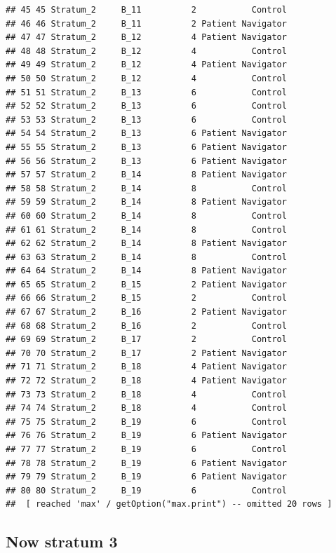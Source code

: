 \documentclass[
]{book}
\begin{document}
\begin{verbatim}
## 45 45 Stratum_2     B_11          2           Control
## 46 46 Stratum_2     B_11          2 Patient Navigator
## 47 47 Stratum_2     B_12          4 Patient Navigator
## 48 48 Stratum_2     B_12          4           Control
## 49 49 Stratum_2     B_12          4 Patient Navigator
## 50 50 Stratum_2     B_12          4           Control
## 51 51 Stratum_2     B_13          6           Control
## 52 52 Stratum_2     B_13          6           Control
## 53 53 Stratum_2     B_13          6           Control
## 54 54 Stratum_2     B_13          6 Patient Navigator
## 55 55 Stratum_2     B_13          6 Patient Navigator
## 56 56 Stratum_2     B_13          6 Patient Navigator
## 57 57 Stratum_2     B_14          8 Patient Navigator
## 58 58 Stratum_2     B_14          8           Control
## 59 59 Stratum_2     B_14          8 Patient Navigator
## 60 60 Stratum_2     B_14          8           Control
## 61 61 Stratum_2     B_14          8           Control
## 62 62 Stratum_2     B_14          8 Patient Navigator
## 63 63 Stratum_2     B_14          8           Control
## 64 64 Stratum_2     B_14          8 Patient Navigator
## 65 65 Stratum_2     B_15          2 Patient Navigator
## 66 66 Stratum_2     B_15          2           Control
## 67 67 Stratum_2     B_16          2 Patient Navigator
## 68 68 Stratum_2     B_16          2           Control
## 69 69 Stratum_2     B_17          2           Control
## 70 70 Stratum_2     B_17          2 Patient Navigator
## 71 71 Stratum_2     B_18          4 Patient Navigator
## 72 72 Stratum_2     B_18          4 Patient Navigator
## 73 73 Stratum_2     B_18          4           Control
## 74 74 Stratum_2     B_18          4           Control
## 75 75 Stratum_2     B_19          6           Control
## 76 76 Stratum_2     B_19          6 Patient Navigator
## 77 77 Stratum_2     B_19          6           Control
## 78 78 Stratum_2     B_19          6 Patient Navigator
## 79 79 Stratum_2     B_19          6 Patient Navigator
## 80 80 Stratum_2     B_19          6           Control
##  [ reached 'max' / getOption("max.print") -- omitted 20 rows ]
\end{verbatim}

\hypertarget{now-stratum-3}{%
\subsection{Now stratum 3}\label{now-stratum-3}}
\end{document}
